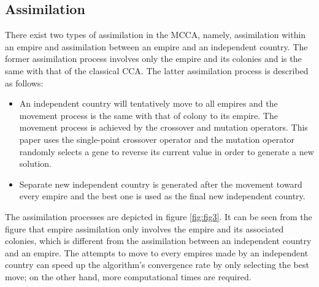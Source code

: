\subsection{Assimilation}
There exist two types of assimilation in the MCCA, namely, assimilation within an empire and assimilation between an empire and an independent country.
The former assimilation process involves only the empire and its colonies and is the same with that of the classical CCA.
The latter assimilation process is described as follows:
\begin{itemize}
	\item An independent country will tentatively move to all empires and the movement process is the same with that of colony to its empire.
	The movement process is achieved by the crossover and mutation operators.
	This paper uses the single-point crossover operator and the mutation operator randomly selects a gene to reverse its current value in order to generate a new solution.
	\item Separate new independent country is generated after the movement toward every empire and the best one is used as the final new independent country.
\end{itemize}

The assimilation processes are depicted in figure \ref{fig:fig3}.
It can be seen from the figure that empire assimilation only involves the empire and its associated colonies, which is different from the assimilation between an independent country and an empire.
The attempts to move to every empires made by an independent country can speed up the algorithm's convergence rate by only selecting the best move; on the other hand, more computational times are required.

